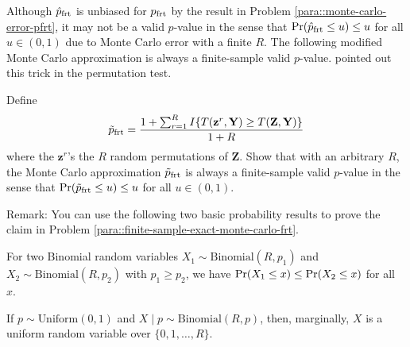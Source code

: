 \begin{HomeworkProblem}\label{exr:3-3}


Although $\hat p_{\text{frt}}$ is unbiased for $p_{\text{frt}}$ by the result in Problem \ref{para::monte-carlo-error-pfrt}, it may not be a valid $p$-value in the sense that $\operatorname{Pr}(\hat p_{\text{frt}} \leq u) \leq u$ for all $u\in (0,1)$ due to Monte Carlo error with a finite $R$. The following modified Monte Carlo approximation is always a finite-sample valid $p$-value. \citet{phipson2010permutation} pointed out this trick in the permutation test.



Define
\[
\tilde p_{\text{frt}}  =  \frac{  1 + \sum_{r=1}^R   I\{ T(\mathbf{z}^r,\mathbf{Y})   \geq T(\mathbf{Z},\mathbf{Y})   \}  }{1+R}
\]
where the $\mathbf{z}^r$'s the $R$ random permutations of $\mathbf{Z}$. Show that with an arbitrary $R$, the Monte Carlo approximation $\tilde p_{\text{frt}} $ is always a finite-sample valid $p$-value in the sense that $\operatorname{Pr}(\tilde p_{\text{frt}} \leq u) \leq u$ for all $u\in (0,1)$.



Remark: You can use the following two basic probability results to prove the claim in Problem \ref{para::finite-sample-exact-monte-carlo-frt}.


\begin{Lemma}
\label{lemma::binomial-order}
For two Binomial random variables $X_1\sim \text{Binomial}(R, p_1)$ and $X_2\sim \text{Binomial}(R, p_2)$ with $p_1\geq p_2$, we have  $\operatorname{Pr}(X_1\leq x) \leq  \operatorname{Pr}(X_2\leq x) $ for all $x.$
\end{Lemma}

\begin{Lemma}
\label{lemma::uniform}
If $p\sim \text{Uniform}(0,1)$ and $X\mid p \sim \text{Binomial}(R, p)$, then, marginally, $X$ is a uniform random variable over $\{ 0,1,\ldots, R  \}$.
\end{Lemma}




\end{HomeworkProblem}

